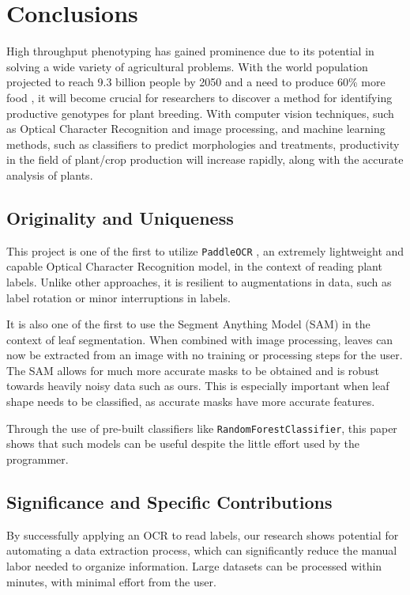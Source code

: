 \documentclass[final,5p,times,twocolumn,authoryear]{elsarticle}
\begin{document}
\section{Conclusions}

High throughput phenotyping has gained prominence due to its potential in solving a wide variety of agricultural problems. With the world population projected to reach 9.3 billion people by 2050 and a need to produce 60\% more food \citep{silva2012feeding}, it will become crucial for researchers to discover a method for identifying productive genotypes for plant breeding. With computer vision techniques, such as Optical Character Recognition and image processing, and machine learning methods, such as classifiers to predict morphologies and treatments, productivity in the field of plant/crop production will increase rapidly, along with the accurate analysis of plants.

\subsection{Originality and Uniqueness}

This project is one of the first to utilize \verb|PaddleOCR| \citep{du2020ppocr}, an extremely lightweight and capable Optical Character Recognition model, in the context of reading plant labels. Unlike other approaches, it is resilient to augmentations in data, such as label rotation or minor interruptions in labels.

It is also one of the first to use the Segment Anything Model (SAM) \citep{kirillov2023segment} in the context of leaf segmentation. When combined with image processing, leaves can now be extracted from an image with no training or processing steps for the user. The SAM allows for much more accurate masks to be obtained and is robust towards heavily noisy data such as ours. This is especially important when leaf shape needs to be classified, as accurate masks have more accurate features.

Through the use of pre-built classifiers like \verb|RandomForestClassifier|, this paper shows that such models can be useful despite the little effort used by the programmer.

\subsection{Significance and Specific Contributions}

By successfully applying an OCR to read labels, our research shows potential for automating a data extraction process, which can significantly reduce the manual labor needed to organize information. Large datasets can be processed within minutes, with minimal effort from the user.
\end{document}
